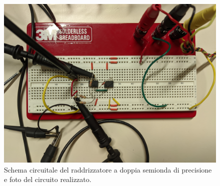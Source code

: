\begin{figure}[ht!]
\begin{minipage}{.45\textwidth}
		\includegraphics[width=\linewidth]{./ImageFiles/Laboratorio 3/CIR21.jpg}
	\end{minipage}
	\caption{Schema circuitale del raddrizzatore a doppia semionda di precisione e foto del circuito realizzato.}
	\label{fig:circuito_1}
\end{figure}

